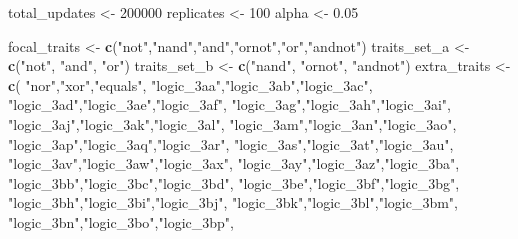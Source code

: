 \documentclass[]{book}
\newenvironment{Shaded}{\begin{snugshade}}{\end{snugshade}}
\newcommand{\DecValTok}[1]{\textcolor[rgb]{0.00,0.00,0.81}{#1}}
\newcommand{\FloatTok}[1]{\textcolor[rgb]{0.00,0.00,0.81}{#1}}
\newcommand{\KeywordTok}[1]{\textcolor[rgb]{0.13,0.29,0.53}{\textbf{#1}}}
\newcommand{\NormalTok}[1]{#1}
\newcommand{\StringTok}[1]{\textcolor[rgb]{0.31,0.60,0.02}{#1}}
\begin{document}
\begin{Shaded}
\begin{Highlighting}[]
\NormalTok{total_updates <-}\StringTok{ }\DecValTok{200000}
\NormalTok{replicates <-}\StringTok{ }\DecValTok{100}
\NormalTok{alpha <-}\StringTok{ }\FloatTok{0.05}

\NormalTok{focal_traits <-}\StringTok{ }\KeywordTok{c}\NormalTok{(}\StringTok{"not"}\NormalTok{,}\StringTok{"nand"}\NormalTok{,}\StringTok{"and"}\NormalTok{,}\StringTok{"ornot"}\NormalTok{,}\StringTok{"or"}\NormalTok{,}\StringTok{"andnot"}\NormalTok{)}
\NormalTok{traits_set_a <-}\StringTok{ }\KeywordTok{c}\NormalTok{(}\StringTok{"not"}\NormalTok{, }\StringTok{"and"}\NormalTok{, }\StringTok{"or"}\NormalTok{)}
\NormalTok{traits_set_b <-}\StringTok{ }\KeywordTok{c}\NormalTok{(}\StringTok{"nand"}\NormalTok{, }\StringTok{"ornot"}\NormalTok{, }\StringTok{"andnot"}\NormalTok{)}
\NormalTok{extra_traits <-}\StringTok{ }\KeywordTok{c}\NormalTok{(}
  \StringTok{"nor"}\NormalTok{,}\StringTok{"xor"}\NormalTok{,}\StringTok{"equals"}\NormalTok{,}
  \StringTok{"logic_3aa"}\NormalTok{,}\StringTok{"logic_3ab"}\NormalTok{,}\StringTok{"logic_3ac"}\NormalTok{,}
  \StringTok{"logic_3ad"}\NormalTok{,}\StringTok{"logic_3ae"}\NormalTok{,}\StringTok{"logic_3af"}\NormalTok{,}
  \StringTok{"logic_3ag"}\NormalTok{,}\StringTok{"logic_3ah"}\NormalTok{,}\StringTok{"logic_3ai"}\NormalTok{,}
  \StringTok{"logic_3aj"}\NormalTok{,}\StringTok{"logic_3ak"}\NormalTok{,}\StringTok{"logic_3al"}\NormalTok{,}
  \StringTok{"logic_3am"}\NormalTok{,}\StringTok{"logic_3an"}\NormalTok{,}\StringTok{"logic_3ao"}\NormalTok{,}
  \StringTok{"logic_3ap"}\NormalTok{,}\StringTok{"logic_3aq"}\NormalTok{,}\StringTok{"logic_3ar"}\NormalTok{,}
  \StringTok{"logic_3as"}\NormalTok{,}\StringTok{"logic_3at"}\NormalTok{,}\StringTok{"logic_3au"}\NormalTok{,}
  \StringTok{"logic_3av"}\NormalTok{,}\StringTok{"logic_3aw"}\NormalTok{,}\StringTok{"logic_3ax"}\NormalTok{,}
  \StringTok{"logic_3ay"}\NormalTok{,}\StringTok{"logic_3az"}\NormalTok{,}\StringTok{"logic_3ba"}\NormalTok{,}
  \StringTok{"logic_3bb"}\NormalTok{,}\StringTok{"logic_3bc"}\NormalTok{,}\StringTok{"logic_3bd"}\NormalTok{,}
  \StringTok{"logic_3be"}\NormalTok{,}\StringTok{"logic_3bf"}\NormalTok{,}\StringTok{"logic_3bg"}\NormalTok{,}
  \StringTok{"logic_3bh"}\NormalTok{,}\StringTok{"logic_3bi"}\NormalTok{,}\StringTok{"logic_3bj"}\NormalTok{,}
  \StringTok{"logic_3bk"}\NormalTok{,}\StringTok{"logic_3bl"}\NormalTok{,}\StringTok{"logic_3bm"}\NormalTok{,}
  \StringTok{"logic_3bn"}\NormalTok{,}\StringTok{"logic_3bo"}\NormalTok{,}\StringTok{"logic_3bp"}\NormalTok{,}

\end{Highlighting}
\end{Shaded}
\end{document}
